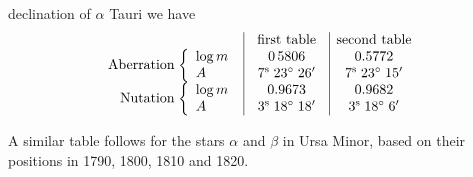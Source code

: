 declination of $\alpha$ Tauri we have \[ \begin{array}{r@{}l|c|c} \multicolumn{2}{c|}{} & \text{first table} & \text{second table}\\ \text{Aberration}\; & \left\{\begin{array}{l}\log m\\ A\end{array}\right. & \begin{array}{c}0\,5806\\7^{\mathrm s}\;23^\circ\;26'\end{array} & \begin{array}{c}0.5772\\7^{\mathrm s}\;23^\circ\;15'\end{array}\\ \text{Nutation}\; & \left\{\begin{array}{l}\log m\\ A\end{array}\right. & \begin{array}{c}0.9673\\3^{\mathrm s}\;18^\circ\;18'\end{array} & \begin{array}{c}0.9682\\3^{\mathrm s}\;18^\circ\;6'\end{array} \end{array} \]

A similar table follows for the stars $\alpha$ and $\beta$ in Ursa Minor, based on their positions in 1790, 1800, 1810 and 1820.

